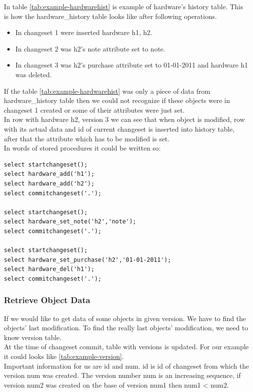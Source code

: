 \documentclass[deska]{subfiles}
\begin{document}
In table \ref{tab:example-hardwarehist} is example of hardware's history table. This is how the hardware\_history table looks like after following operations. 
\begin{itemize}
    \item In changeset 1 were inserted hardware h1, h2.
    \item In changeset 2 was h2's note attribute set to note.
    \item In changeset 3 was h2's purchase attribute set to 01-01-2011 and hardware h1 was deleted.
\end{itemize}


If the table \ref{tab:example-hardwarehist} was only a piece of data from hardware\_history table then we could not recognize if these objects were in changeset 1 created or some of their attributes were just set.\\
In row with hardware h2, version 3 we can see that when object is modified, row with its actual data and id of current changeset is inserted into history table, after that the attribute which has to be modified is set.\\
In words of stored procedures it could be written so:\\

\begin{verbatim}
select startchangeset();
select hardware_add('h1');
select hardware_add('h2');
select commitchangeset('.');

select startchangeset();
select hardware_set_note('h2','note');
select commitchangeset('.');

select startchangeset();
select hardware_set_purchase('h2','01-01-2011');
select hardware_del('h1');
select commitchangeset('.');
\end{verbatim}

\subsubsection{Retrieve Object Data}

If we would like to get data of some objects in given version. We have to find the objects' last modification. To find the really last objects' modification, we need to know version table.\\
At the time of changeset commit, table with versions is updated. For our example it could looks like \ref{tab:example-version}.\\
Important information for us are id and num. id is id of changeset from which the version num was created. The version number num is an increasing sequence, if version num2 was created on the base of version num1 then num1 < num2.
\end{document}

